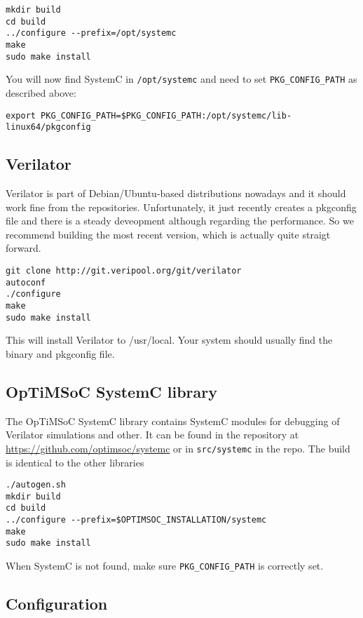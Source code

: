 \begin{lstlisting}
mkdir build
cd build
../configure --prefix=/opt/systemc
make
sudo make install
\end{lstlisting}

You will now find SystemC in \verb|/opt/systemc| and need to set
\verb|PKG_CONFIG_PATH| as described above:

\begin{lstlisting}
export PKG_CONFIG_PATH=$PKG_CONFIG_PATH:/opt/systemc/lib-linux64/pkgconfig
\end{lstlisting}

\subsection{Verilator}

Verilator is part of Debian/Ubuntu-based distributions nowadays and it
should work fine from the repositories. Unfortunately, it just
recently creates a pkgconfig file and there is a steady deveopment
although regarding the performance. So we recommend building the most
recent version, which is actually quite straigt forward.

\begin{lstlisting}
git clone http://git.veripool.org/git/verilator
autoconf
./configure
make
sudo make install
\end{lstlisting}

This will install Verilator to /usr/local. Your system should usually
find the binary and pkgconfig file.

\subsection{OpTiMSoC SystemC library}

The OpTiMSoC SystemC library contains SystemC modules for debugging of
Verilator simulations and other. It can be found in the repository at
\url{https://github.com/optimsoc/systemc} or in \texttt{src/systemc}
in the repo. The build is identical to the other libraries

\begin{lstlisting}
./autogen.sh
mkdir build
cd build
../configure --prefix=$OPTIMSOC_INSTALLATION/systemc
make
sudo make install
\end{lstlisting}

When SystemC is not found, make sure \verb|PKG_CONFIG_PATH| is
correctly set.

\subsection{Configuration}

